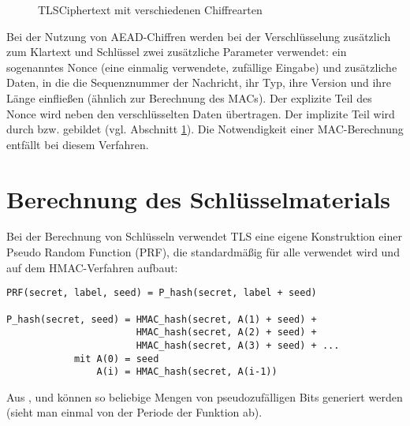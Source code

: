 \begin{figure}[H]
	\caption{TLSCiphertext mit verschiedenen Chiffrearten}
	\label{fig_tls_cipher_types}
\end{figure}

Bei der Nutzung von AEAD-Chiffren werden bei der Verschlüsselung zusätzlich zum Klartext und Schlüssel zwei zusätzliche Parameter verwendet: ein sogenanntes Nonce (eine einmalig verwendete, zufällige Eingabe) und zusätzliche Daten, in die die Sequenznummer der Nachricht, ihr Typ, ihre Version und ihre Länge einfließen (ähnlich zur Berechnung des MACs). Der explizite Teil des Nonce wird neben den verschlüsselten Daten übertragen. Der implizite Teil wird durch  bzw.  gebildet (vgl. Abschnitt \ref{sec_key_material}). Die Notwendigkeit einer MAC-Berechnung entfällt bei diesem Verfahren.

\section{Berechnung des Schlüsselmaterials}
\label{sec_key_material}

Bei der Berechnung von Schlüsseln verwendet TLS eine eigene Konstruktion einer Pseudo Random Function (PRF), die standardmäßig für alle \ciphersuites{} verwendet wird und auf dem HMAC-Verfahren aufbaut:

\begin{lstlisting}
PRF(secret, label, seed) = P_hash(secret, label + seed)

P_hash(secret, seed) = HMAC_hash(secret, A(1) + seed) +
					   HMAC_hash(secret, A(2) + seed) +
					   HMAC_hash(secret, A(3) + seed) + ...
			mit A(0) = seed
				A(i) = HMAC_hash(secret, A(i-1))
\end{lstlisting}

Aus ,  und  können so beliebige Mengen von pseudozufälligen Bits generiert werden (sieht man einmal von der Periode der Funktion ab).


